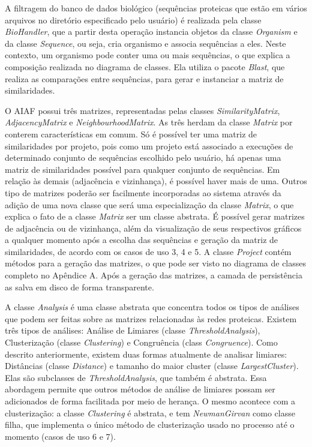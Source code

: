 
A filtragem do banco de dados biológico (sequências proteicas que estão em vários arquivos no diretório especificado pelo usuário) é realizada pela classe
\textit{BioHandler}, que a partir desta operação instancia objetos da classe \textit{Organism} e da classe \textit{Sequence}, ou seja, cria organismo e associa
sequências a eles. Neste contexto, um organismo pode conter uma ou mais sequências, o que explica a composição realizada no diagrama de classes.
Ela utiliza o pacote \textit{Blast}, que realiza as comparações entre sequências, para gerar e instanciar a matriz de similaridades.

O AIAF possui três matrizes, representadas pelas classes \textit{SimilarityMatrix}, \textit{AdjacencyMatrix} e \textit{NeighbourhoodMatrix}. As três herdam
da classe \textit{Matrix} por conterem características em comum. Só é possível ter uma matriz de similaridades por projeto, pois como um projeto está associado
a execuções de determinado conjunto de sequências escolhido pelo usuário, há apenas uma matriz de similaridades possível para qualquer conjunto de sequências.
Em relação às demais (adjacência e vizinhança), é possível haver mais de uma. Outros tipo de matrizes poderão ser
facilmente incorporadas ao sistema através da adição de uma nova classe que será uma especialização da classe \textit{Matrix}, o que explica o fato de a classe
\textit{Matrix} ser um classe abstrata. É possível gerar matrizes de adjacência ou de vizinhança, além da visualização de seus respectivos gráficos a qualquer
momento após a escolha das sequências e geração da matriz de similaridades, de acordo com os casos de uso 3, 4 e 5. A classe \textit{Project} contém métodos
para a geração das matrizes, o que pode ser visto no diagrama de classes completo no Apêndice A.
Após a geração das matrizes, a camada de persistência as salva em disco de forma transparente.

A classe \textit{Analysis} é uma classe abstrata que concentra todos os tipos de análises que podem ser feitas sobre as matrizes relacionadas às redes
proteicas. Existem três tipos de análises: Análise de Limiares (classe \textit{ThresholdAnalysis}), Clusterização (classe \textit{Clustering}) e
Congruência (class \textit{Congruence}). Como descrito anteriormente, existem duas formas atualmente de analisar limiares: Distâncias (classe
\textit{Distance}) e tamanho do maior cluster (classe \textit{LargestCluster}). Elas são subclasses de \textit{ThresholdAnalysis}, que também é abstrata. Essa
abordagem permite que outros métodos de análise de limiares possam ser adicionados de forma facilitada por meio de herança. O mesmo acontece com a
clusterização: a classe \textit{Clustering} é abstrata, e tem \textit{NewmanGirvan} como classe filha, que implementa o único método de clusterização
usado no processo até o momento (casos de uso 6 e 7).


